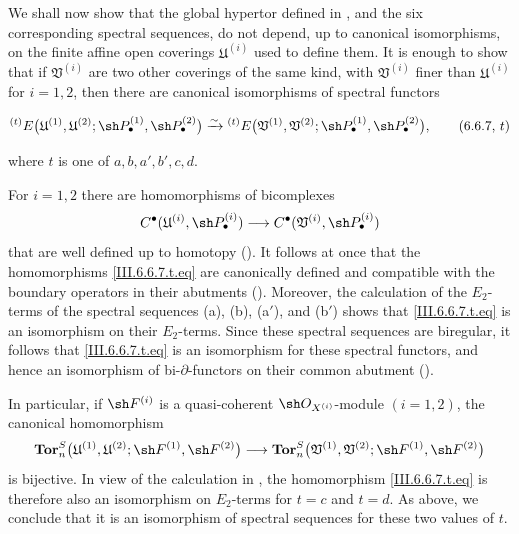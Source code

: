 \begin{env}[6.6.7]
\label{III.6.6.7}
We shall now show that the global hypertor defined in
, and the six corresponding spectral sequences,
do not depend, up to canonical isomorphisms, on the finite affine
open coverings $\mathfrak U^{(i)}$ used to define them.  It is
enough to show that if $\mathfrak V^{(i)}$ are two other
coverings of the same kind, with $\mathfrak V^{(i)}$ finer than
$\mathfrak U^{(i)}$ for $i=1,2$, then there are canonical
isomorphisms of spectral functors
\begin{env}[6.6.7, $t$]
\label{III.6.6.7.t}
\[
  {}^{(t)}E
  \bigl(
    \mathfrak U^{(1)},\mathfrak U^{(2)};
    \sh P_\bullet^{(1)},\sh P_\bullet^{(2)}
  \bigr)
  \xrightarrow{\sim}
  {}^{(t)}E
  \bigl(
    \mathfrak V^{(1)},\mathfrak V^{(2)};
    \sh P_\bullet^{(1)},\sh P_\bullet^{(2)}
  \bigr),
  \tag{6.6.7, $t$}\label{III.6.6.7.t.eq}
\]
\end{env}
where $t$ is one of $a,b,a',b',c,d$.

For $i=1,2$ there are homomorphisms of bicomplexes
\[
  C^\bullet
  (\mathfrak U^{(i)},\sh P_\bullet^{(i)})
  \longrightarrow
  C^\bullet
  (\mathfrak V^{(i)},\sh P_\bullet^{(i)})
\]
that are well defined up to homotopy
().  It follows at once that the
homomorphisms \eqref{III.6.6.7.t.eq} are canonically defined and
compatible with the boundary operators in their abutments
().  Moreover, the calculation of the
$E_2$-terms of the spectral sequences
\textnormal{(a)}, \textnormal{(b)}, \textnormal{(a$'$)}, and
\textnormal{(b$'$)} shows that
\eqref{III.6.6.7.t.eq} is an isomorphism on their $E_2$-terms.
Since these spectral sequences are biregular, it follows that
\eqref{III.6.6.7.t.eq} is an isomorphism for these spectral
functors, and hence an isomorphism of bi-$\partial$-functors on
their common abutment ().

In particular, if $\sh F^{(i)}$ is a quasi-coherent
$\sh O_{X^{(i)}}$-module $(i=1,2)$, the canonical homomorphism
\[
  \mathbf{Tor}_n^S
  \bigl(
    \mathfrak U^{(1)},\mathfrak U^{(2)};
    \sh F^{(1)},\sh F^{(2)}
  \bigr)
  \longrightarrow
  \mathbf{Tor}_n^S
  \bigl(
    \mathfrak V^{(1)},\mathfrak V^{(2)};
    \sh F^{(1)},\sh F^{(2)}
  \bigr)
\]
is bijective.  In view of the calculation in
, the homomorphism
\eqref{III.6.6.7.t.eq} is therefore also an isomorphism on
$E_2$-terms for $t=c$ and $t=d$.  As above, we conclude that it
is an isomorphism of spectral sequences for these two values of
$t$.


\end{env}
